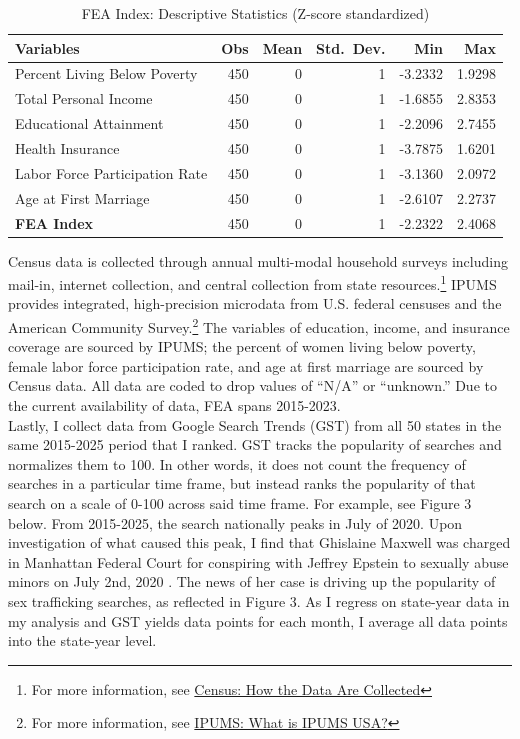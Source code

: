 \documentclass[10pt]{article}
\begin{document}
\begin{table}[H]

\centering
\caption{FEA Index: Descriptive Statistics (Z-score standardized)}
\begin{tabular}{lrrrrr}

Variables & Obs & Mean & Std.\ Dev. & Min & Max \\
\midrule
Percent Living Below Poverty & 450 & 0 & 1 & -3.2332 & 1.9298 \\
Total Personal Income & 450 & 0 & 1 & -1.6855 & 2.8353 \\
Educational Attainment & 450 & 0 & 1 & -2.2096 & 2.7455 \\
Health Insurance & 450 & 0 & 1 & -3.7875 & 1.6201 \\
Labor Force Participation Rate & 450 & 0 & 1 & -3.1360 & 2.0972 \\
Age at First Marriage & 450 & 0 & 1 & -2.6107 & 2.2737 \\
\textbf{FEA Index} & 450 & 0 & 1 & -2.2322 & 2.4068 \\
\bottomrule
\end{tabular}
\end{table}
\indent Census data is collected through annual multi-modal household surveys including mail-in, internet collection, and central collection from state resources.\footnote{For more information, see \href{https://www.census.gov/programs-surveys/gov-finances/technical-documentation/methodology/how-the-data-are-collected.html}{Census: How the Data Are Collected}} IPUMS provides integrated, high-precision microdata from U.S. federal censuses and the American Community Survey.\footnote{For more information, see \href{https://usa.ipums.org/usa/intro.shtml}{IPUMS: What is IPUMS USA?}} The variables of education, income, and insurance coverage are sourced by IPUMS; the percent of women living below poverty, female labor force participation rate, and age at first marriage are sourced by Census data. All data are coded to drop values of ``N/A'' or ``unknown.'' Due to the current availability of data, FEA spans 2015-2023. \\
\indent Lastly, I collect data from Google Search Trends (GST) from all 50 states in the same 2015-2025 period that I ranked. GST tracks the popularity of searches and normalizes them to 100. In other words, it does not count the frequency of searches in a particular time frame, but instead ranks the popularity of that search on a scale of 0-100 across said time frame. For example, see Figure 3 below. From 2015-2025, the search nationally peaks in July of 2020. Upon investigation of what caused this peak, I find that Ghislaine Maxwell was charged in Manhattan Federal Court for conspiring with Jeffrey Epstein to sexually abuse minors on July 2nd, 2020 \citep{sdny_maxwell2020}. The news of her case is driving up the popularity of sex trafficking searches, as reflected in Figure 3. As I regress on state-year data in my analysis and GST yields data points for each month, I average all data points into the state-year level.
\end{document}
